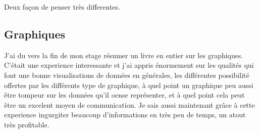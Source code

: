 Deux façon de penser très differentes.

\subsection{Graphiques}
J'ai du vers la fin de mon stage résumer un livre en entier sur les graphiques. C'était une experience interessante et j'ai appris énormement sur les qualités qui font une bonne visualisations de données en générales, les différentes possibilité offertes par les différents type de graphique, à quel point un graphique peu aussi être tompeur sur les données qu'il oense représenter, et à quel point cela peut être un excelent moyen de communication. Je sais aussi maintenant grâce à cette experience ingurgiter beaucoup d'informations en très peu de temps, un atout très profitable.
